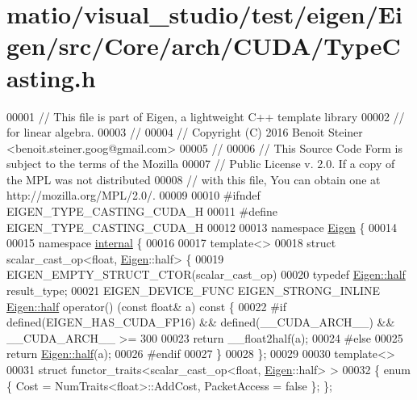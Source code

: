 \hypertarget{matio_2visual__studio_2test_2eigen_2_eigen_2src_2_core_2arch_2_c_u_d_a_2_type_casting_8h_source}{}\section{matio/visual\+\_\+studio/test/eigen/\+Eigen/src/\+Core/arch/\+C\+U\+D\+A/\+Type\+Casting.h}
\label{matio_2visual__studio_2test_2eigen_2_eigen_2src_2_core_2arch_2_c_u_d_a_2_type_casting_8h_source}

\begin{DoxyCode}
00001 \textcolor{comment}{// This file is part of Eigen, a lightweight C++ template library}
00002 \textcolor{comment}{// for linear algebra.}
00003 \textcolor{comment}{//}
00004 \textcolor{comment}{// Copyright (C) 2016 Benoit Steiner <benoit.steiner.goog@gmail.com>}
00005 \textcolor{comment}{//}
00006 \textcolor{comment}{// This Source Code Form is subject to the terms of the Mozilla}
00007 \textcolor{comment}{// Public License v. 2.0. If a copy of the MPL was not distributed}
00008 \textcolor{comment}{// with this file, You can obtain one at http://mozilla.org/MPL/2.0/.}
00009 
00010 \textcolor{preprocessor}{#ifndef EIGEN\_TYPE\_CASTING\_CUDA\_H}
00011 \textcolor{preprocessor}{#define EIGEN\_TYPE\_CASTING\_CUDA\_H}
00012 
00013 \textcolor{keyword}{namespace }\hyperlink{namespace_eigen}{Eigen} \{
00014 
00015 \textcolor{keyword}{namespace }\hyperlink{namespaceinternal}{internal} \{
00016 
00017 \textcolor{keyword}{template}<>
00018 \textcolor{keyword}{struct }scalar\_cast\_op<float, \hyperlink{namespace_eigen}{Eigen}::half> \{
00019   EIGEN\_EMPTY\_STRUCT\_CTOR(scalar\_cast\_op)
00020   \textcolor{keyword}{typedef} \hyperlink{struct_eigen_1_1half}{Eigen::half} result\_type;
00021   EIGEN\_DEVICE\_FUNC EIGEN\_STRONG\_INLINE \hyperlink{struct_eigen_1_1half}{Eigen::half} operator() (\textcolor{keyword}{const} \textcolor{keywordtype}{float}& a)\textcolor{keyword}{ const }\{
00022 \textcolor{preprocessor}{    #if defined(EIGEN\_HAS\_CUDA\_FP16) && defined(\_\_CUDA\_ARCH\_\_) && \_\_CUDA\_ARCH\_\_ >= 300}
00023       \textcolor{keywordflow}{return} \_\_float2half(a);
00024 \textcolor{preprocessor}{    #else}
00025       \textcolor{keywordflow}{return} \hyperlink{struct_eigen_1_1half}{Eigen::half}(a);
00026 \textcolor{preprocessor}{    #endif}
00027   \}
00028 \};
00029 
00030 \textcolor{keyword}{template}<>
00031 \textcolor{keyword}{struct }functor\_traits<scalar\_cast\_op<float, \hyperlink{namespace_eigen}{Eigen}::half> >
00032 \{ \textcolor{keyword}{enum} \{ Cost = NumTraits<float>::AddCost, PacketAccess = \textcolor{keyword}{false} \}; \};

\end{DoxyCode}
